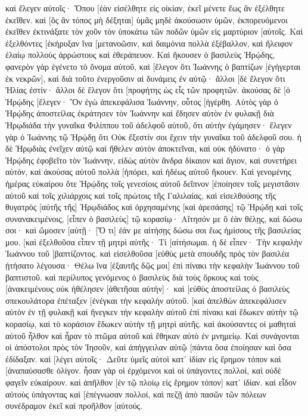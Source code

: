 καὶ ἔλεγεν αὐτοῖς· Ὅπου [ἐὰν εἰσέλθητε εἰς οἰκίαν, ἐκεῖ μένετε ἕως ἂν ἐξέλθητε ἐκεῖθεν. 
καὶ [ὃς ἂν τόπος μὴ δέξηται] ὑμᾶς μηδὲ ἀκούσωσιν ὑμῶν, ἐκπορευόμενοι ἐκεῖθεν ἐκτινάξατε τὸν χοῦν τὸν ὑποκάτω τῶν ποδῶν ὑμῶν εἰς μαρτύριον [αὐτοῖς. 
Καὶ ἐξελθόντες [ἐκήρυξαν ἵνα [μετανοῶσιν, 
καὶ δαιμόνια πολλὰ ἐξέβαλλον, καὶ ἤλειφον ἐλαίῳ πολλοὺς ἀρρώστους καὶ ἐθεράπευον. 
Καὶ ἤκουσεν ὁ βασιλεὺς Ἡρῴδης, φανερὸν γὰρ ἐγένετο τὸ ὄνομα αὐτοῦ, καὶ [ἔλεγον ὅτι Ἰωάννης ὁ βαπτίζων [ἐγήγερται ἐκ νεκρῶν], καὶ διὰ τοῦτο ἐνεργοῦσιν αἱ δυνάμεις ἐν αὐτῷ· 
ἄλλοι [δὲ ἔλεγον ὅτι Ἠλίας ἐστίν· ἄλλοι δὲ ἔλεγον ὅτι [προφήτης ὡς εἷς τῶν προφητῶν. 
ἀκούσας δὲ [ὁ Ἡρῴδης [ἔλεγεν· Ὃν ἐγὼ ἀπεκεφάλισα Ἰωάννην, οὗτος [ἠγέρθη. 
Αὐτὸς γὰρ ὁ Ἡρῴδης ἀποστείλας ἐκράτησεν τὸν Ἰωάννην καὶ ἔδησεν αὐτὸν ἐν φυλακῇ διὰ Ἡρῳδιάδα τὴν γυναῖκα Φιλίππου τοῦ ἀδελφοῦ αὐτοῦ, ὅτι αὐτὴν ἐγάμησεν· 
ἔλεγεν γὰρ ὁ Ἰωάννης τῷ Ἡρῴδῃ ὅτι Οὐκ ἔξεστίν σοι ἔχειν τὴν γυναῖκα τοῦ ἀδελφοῦ σου. 
ἡ δὲ Ἡρῳδιὰς ἐνεῖχεν αὐτῷ καὶ ἤθελεν αὐτὸν ἀποκτεῖναι, καὶ οὐκ ἠδύνατο· 
ὁ γὰρ Ἡρῴδης ἐφοβεῖτο τὸν Ἰωάννην, εἰδὼς αὐτὸν ἄνδρα δίκαιον καὶ ἅγιον, καὶ συνετήρει αὐτόν, καὶ ἀκούσας αὐτοῦ πολλὰ [ἠπόρει, καὶ ἡδέως αὐτοῦ ἤκουεν. 
Καὶ γενομένης ἡμέρας εὐκαίρου ὅτε Ἡρῴδης τοῖς γενεσίοις αὐτοῦ δεῖπνον [ἐποίησεν τοῖς μεγιστᾶσιν αὐτοῦ καὶ τοῖς χιλιάρχοις καὶ τοῖς πρώτοις τῆς Γαλιλαίας, 
καὶ εἰσελθούσης τῆς θυγατρὸς [αὐτῆς τῆς] Ἡρῳδιάδος καὶ ὀρχησαμένης [καὶ ἀρεσάσης] τῷ Ἡρῴδῃ καὶ τοῖς συνανακειμένοις, [εἶπεν ὁ βασιλεὺς] τῷ κορασίῳ· Αἴτησόν με ὃ ἐὰν θέλῃς, καὶ δώσω σοι· 
καὶ ὤμοσεν [αὐτῇ· [Ὅ τι] ἐάν με αἰτήσῃς δώσω σοι ἕως ἡμίσους τῆς βασιλείας μου. 
[καὶ ἐξελθοῦσα εἶπεν τῇ μητρὶ αὐτῆς· Τί [αἰτήσωμαι. ἡ δὲ εἶπεν· Τὴν κεφαλὴν Ἰωάννου τοῦ [βαπτίζοντος. 
καὶ εἰσελθοῦσα [εὐθὺς μετὰ σπουδῆς πρὸς τὸν βασιλέα ᾐτήσατο λέγουσα· Θέλω ἵνα [ἐξαυτῆς δῷς μοι] ἐπὶ πίνακι τὴν κεφαλὴν Ἰωάννου τοῦ βαπτιστοῦ. 
καὶ περίλυπος γενόμενος ὁ βασιλεὺς διὰ τοὺς ὅρκους καὶ τοὺς [ἀνακειμένους οὐκ ἠθέλησεν [ἀθετῆσαι αὐτήν]· 
καὶ [εὐθὺς ἀποστείλας ὁ βασιλεὺς σπεκουλάτορα ἐπέταξεν [ἐνέγκαι τὴν κεφαλὴν αὐτοῦ. [καὶ ἀπελθὼν ἀπεκεφάλισεν αὐτὸν ἐν τῇ φυλακῇ 
καὶ ἤνεγκεν τὴν κεφαλὴν αὐτοῦ ἐπὶ πίνακι καὶ ἔδωκεν αὐτὴν τῷ κορασίῳ, καὶ τὸ κοράσιον ἔδωκεν αὐτὴν τῇ μητρὶ αὐτῆς. 
καὶ ἀκούσαντες οἱ μαθηταὶ αὐτοῦ ἦλθον καὶ ἦραν τὸ πτῶμα αὐτοῦ καὶ ἔθηκαν αὐτὸ ἐν μνημείῳ. 
Καὶ συνάγονται οἱ ἀπόστολοι πρὸς τὸν Ἰησοῦν, καὶ ἀπήγγειλαν αὐτῷ [πάντα ὅσα ἐποίησαν καὶ ὅσα ἐδίδαξαν. 
καὶ [λέγει αὐτοῖς· Δεῦτε ὑμεῖς αὐτοὶ κατ᾽ ἰδίαν εἰς ἔρημον τόπον καὶ [ἀναπαύσασθε ὀλίγον. ἦσαν γὰρ οἱ ἐρχόμενοι καὶ οἱ ὑπάγοντες πολλοί, καὶ οὐδὲ φαγεῖν εὐκαίρουν. 
καὶ ἀπῆλθον [ἐν τῷ πλοίῳ εἰς ἔρημον τόπον] κατ᾽ ἰδίαν. 
καὶ εἶδον αὐτοὺς ὑπάγοντας καὶ [ἐπέγνωσαν πολλοί, καὶ πεζῇ ἀπὸ πασῶν τῶν πόλεων συνέδραμον ἐκεῖ καὶ προῆλθον [αὐτούς. 

